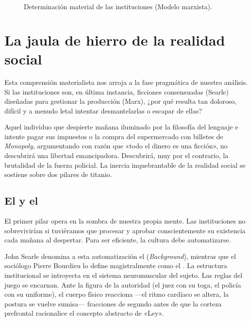 \begin{figure}[htbp]
    \centering
    
    \caption{Determinación material de las instituciones (Modelo marxista).}
    \label{fig:base_superestructura}
\end{figure}

\section{La jaula de hierro de la realidad social}

Esta comprensión materialista nos arroja a la fase pragmática de nuestro análisis. Si las instituciones son, en última instancia, ficciones consensuadas (Searle) diseñadas para gestionar la producción (Marx), ¿por qué resulta tan doloroso, difícil y a menudo letal intentar desmantelarlas o escapar de ellas? 

Aquel individuo que despierte mañana iluminado por la filosofía del lenguaje e intente pagar sus impuestos o la compra del supermercado con billetes de \textit{Monopoly}, argumentando con razón que «todo el dinero es una ficción», no descubrirá una libertad emancipadora. Descubrirá, muy por el contrario, la brutalidad de la fuerza policial. La inercia inquebrantable de la realidad social se sostiene sobre dos pilares de titanio.

\subsection{El \Habitus{} y el \Trasfondo}

El primer pilar opera en la sombra de nuestra propia mente. Las instituciones no sobrevivirían si tuviéramos que procesar y aprobar conscientemente su existencia cada mañana al despertar. Para ser eficiente, la cultura debe automatizarse. 

John Searle denomina a esta automatización el \textbf{\Trasfondo} (\textit{Background}), mientras que el sociólogo Pierre Bourdieu lo define magistralmente como el \textbf{\Habitus}. La estructura institucional se introyecta en el sistema neuromuscular del sujeto. Las reglas del juego se encarnan. Ante la figura de la autoridad (el juez con su toga, el policía con su uniforme), el cuerpo físico reacciona —el ritmo cardíaco se altera, la postura se vuelve sumisa— fracciones de segundo antes de que la corteza prefrontal racionalice el concepto abstracto de «Ley». 

